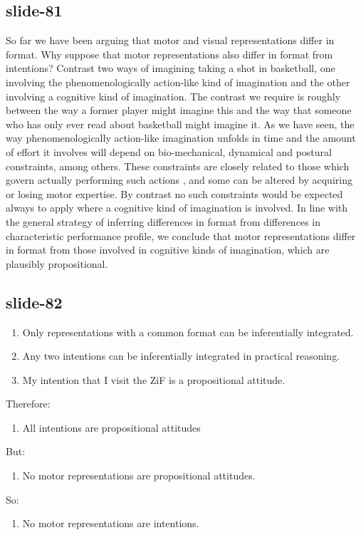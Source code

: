 \documentclass[12pt,\papersize]{extarticle}
\begin{document}
\subsection{slide-81}
So far we have been arguing that motor and visual representations differ in format. Why suppose that
motor representations also differ in format from intentions? Contrast two ways of imagining taking a
shot in basketball, one involving the phenomenologically action-like kind of imagination and the
other involving a cognitive kind of imagination. The contrast we require is roughly between the way
a former player might imagine this and the way that someone who has only ever read about basketball
might imagine it. As we have seen, the way phenomenologically action-like imagination unfolds in
time and the amount of effort it involves will depend on bio-mechanical, dynamical and postural
constraints, among others. These constraints are closely related to those which govern actually
performing such actions \citep{Jeannerod:2001yb}, and some can be altered by acquiring or losing
motor expertise. By contrast no such constraints would be expected always to apply where a cognitive
kind of imagination is involved. In line with the general strategy of inferring differences in
format from differences in characteristic performance profile, we conclude that motor
representations differ in format from those involved in cognitive kinds of imagination, which are
plausibly propositional.
 
\subsection{slide-82}
\begin{enumerate}
\item Only representations with a common format can be inferentially integrated.
\item Any two intentions can be inferentially integrated in practical reasoning.
\item My intention that I visit the ZiF is a propositional attitude.
\end{enumerate}
Therefore:
\begin{enumerate}[resume]
\item All intentions are propositional attitudes
\end{enumerate}
But:
\begin{enumerate}[resume]
\item No motor representations are propositional attitudes.
\end{enumerate}
So:
\begin{enumerate}[resume]
\item No motor representations are intentions.
\end{enumerate}
 
\end{document}
